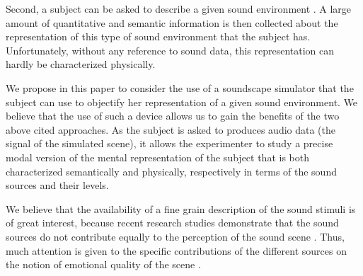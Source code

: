 \documentclass[twoside,twocolumn]{article}
\begin{document}
Second, a subject can be asked to describe a given sound environment \cite{guastavino2006ideal, dubois2006cognitive}. A large amount of quantitative and semantic information is then collected about the representation of this type of sound environment that the subject has. Unfortunately, without any reference to sound data, this representation can hardly be characterized physically.


We propose in this paper to consider the use of a soundscape simulator that the subject can use to objectify her representation of a given sound environment. We believe that the use of such a device allows us to gain the benefits of the two above cited approaches. As the subject is asked to produces audio data (the signal of the simulated scene), it allows the experimenter to study a precise modal version of the mental representation of the subject that is both characterized semantically and physically, respectively in terms of the sound sources and their levels.


We believe that the availability of a fine grain description of the sound stimuli is of great interest, because recent research studies demonstrate that the sound sources do not contribute equally to the perception of the sound scene \cite{defreville2004aactivity,lavandier2006contribution,guastavino2006ideal,nilsson2007soundscape,
szeremeta2009analysis}. Thus, much attention is given to the specific contributions of the different sources on the notion of emotional quality of the scene \cite{gozalo2015relationship,ricciardi2015sound}.
\end{document}
